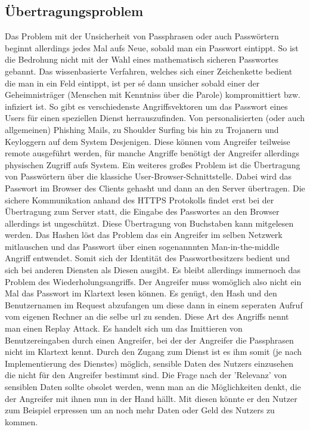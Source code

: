 \subsection{Übertragungsproblem}
Das Problem mit der Unsicherheit von Passphrasen oder auch Passwörtern beginnt allerdings jedes Mal aufs Neue, sobald man ein Passwort eintippt. So ist die Bedrohung nicht mit der Wahl eines mathematisch sicheren Passwortes gebannt. Das wissenbasierte Verfahren, welches sich einer Zeichenkette bedient die man in ein Feld eintippt, ist per sé dann unsicher sobald einer der Geheimnisträger (Menschen mit Kenntniss über die Parole) kompromittiert bzw. infiziert ist. So gibt es verschiedenste Angriffsvektoren um das Passwort eines Users für einen speziellen Dienst herrauszufinden. Von personalisierten (oder auch allgemeinen) Phishing Mails, zu Shoulder Surfing bis hin zu Trojanern und Keyloggern auf dem System Desjenigen. Diese können vom Angreifer teilweise remote ausgeführt werden, für manche Angriffe benötigt der Angreifer allerdings physischen Zugriff aufs System. Ein weiteres großes Problem ist die Übertragung von Passwörtern über die klassiche User-Browser-Schnittstelle. Dabei wird das Passwort im Browser des Clients gehasht und dann an den Server übertragen. Die sichere Kommunikation anhand des HTTPS Protokolls findet erst bei der Übertragung zum Server statt, die Eingabe des Passwortes an den Browser allerdings ist ungeschützt. Diese Übertragung von Buchstaben kann mitgelesen werden. Das Hashen löst das Problem das ein Angreifer im selben Netzwerk mitlauschen und das Passwort über einen sogenannnten Man-in-the-middle Angriff entwendet. Somit sich der Identität des Passwortbesitzers bedient und sich bei anderen Diensten als Diesen ausgibt. Es bleibt allerdings immernoch das Problem des Wiederholungsangriffs. Der Angreifer muss womöglich also nicht ein Mal das Passwort im Klartext lesen können. Es genügt, den Hash und den Benutzernamen im Request abzufangen um diese dann in einem seperaten Aufruf vom eigenen Rechner an die selbe \ac{url} zu senden. Diese Art des Angriffs nennt man einen Replay Attack. Es handelt sich um das Imittieren von Benutzereingaben durch einen Angreifer, bei der der Angreifer die Passphrasen nicht im Klartext kennt.
Durch den Zugang zum Dienst ist es ihm somit (je nach Implementierung des Dienstes) möglich, sensible Daten des Nutzers einzusehen die nicht für den Angreifer bestimmt sind. Die Frage nach der 'Relevanz' von sensiblen Daten sollte obsolet werden, wenn man an die Möglichkeiten denkt, die der Angreifer mit ihnen nun in der Hand hällt. Mit diesen könnte er den Nutzer zum Beispiel erpressen um an noch mehr Daten oder Geld des Nutzers zu kommen.

